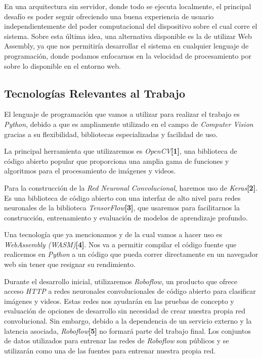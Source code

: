 \documentclass[a4paper]{article}
\begin{document}
En una arquitectura sin servidor, donde todo se ejecuta localmente, el principal desafío es poder seguir ofreciendo una buena experiencia de usuario independientemente del poder computacional del dispositivo sobre el cual corre el sistema. Sobre esta última idea, una alternativa disponible es la de utilizar Web Assembly, ya que nos permitiría desarrollar el sistema en cualquier lenguaje de programación, donde podamos enfocarnos en la velocidad de procesamiento por sobre lo disponible en el entorno web.

\subsection{Tecnologías Relevantes al Trabajo}
El lenguaje de programación que vamos a utilizar para realizar el trabajo es \emph{Python}, debido a que es ampliamente utilizado en el campo de \emph{Computer Vision} gracias a su flexibilidad, bibliotecas especializadas y facilidad de uso.

La principal herramienta que utilizaremos es \emph{OpenCV}\textbf{[1]}, una biblioteca de código abierto popular que proporciona una amplia gama de funciones y algoritmos para el procesamiento de imágenes y videos.

Para la construcción de la \emph{Red Neuronal Convolucional}, haremos uso de \emph{Keras}\textbf{[2]}. Es una biblioteca de código abierto con una interfaz de alto nivel para redes neuronales de la biblioteca \emph{TensorFlow}\textbf{[3]}, que usaremos para facilitarnos la construcción, entrenamiento y evaluación de modelos de aprendizaje profundo.

Una tecnología que ya mencionamos y de la cual vamos a hacer uso es \emph{WebAssembly (WASM)}\textbf{[4]}. Nos va a permitir compilar el código fuente que realicemos en \emph{Python} a un código que pueda correr directamente en un navegador web sin tener que resignar su rendimiento.

Durante el desarrollo inicial, utilizaremos \emph{Roboflow}, un producto que ofrece acceso \emph{HTTP} a redes neuronales convolucionales de código abierto para clasificar imágenes y videos. Estas redes nos ayudarán en las pruebas de concepto y evaluación de opciones de desarrollo sin necesidad de crear nuestra propia red convolucional.
Sin embargo, debido a la dependencia de un servicio externo y la latencia asociada, \emph{Roboflow}\textbf{[5]} no formará parte del trabajo final. Los conjuntos de datos utilizados para entrenar las redes de \emph{Roboflow} son públicos y se utilizarán como una de las fuentes para entrenar nuestra propia red.\\
\end{document}
